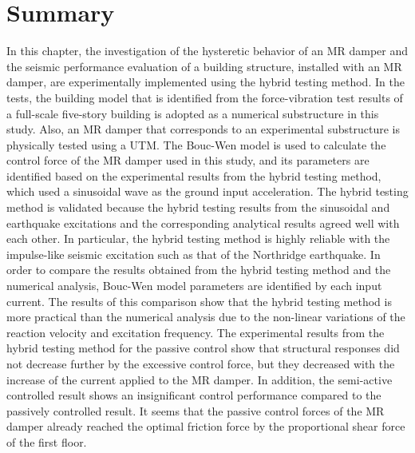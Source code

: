 \section{Summary}
In this chapter, the investigation of the hysteretic behavior of an MR damper and the seismic performance evaluation of a building structure, installed with an MR damper, are experimentally implemented using the hybrid testing method. In the tests, the building model that is identified from the force-vibration test results of a full-scale five-story building is adopted as a numerical substructure in this study. Also, an MR damper that corresponds to an experimental substructure is physically tested using a UTM. The Bouc-Wen model is used to calculate the control force of the MR damper used in this study, and its parameters are identified based on the experimental results from the hybrid testing method, which used a sinusoidal wave as the ground input acceleration. The hybrid testing method is validated because the hybrid testing results from the sinusoidal and earthquake excitations and the corresponding analytical results agreed well with each other. In particular, the hybrid testing method is highly reliable with the impulse-like seismic excitation such as that of the Northridge earthquake. In order to compare the results obtained from the hybrid testing method and the numerical analysis, Bouc-Wen model parameters are identified by each input current. The results of this comparison show that the hybrid testing method is more practical than the numerical analysis due to the non-linear variations of the reaction velocity and excitation frequency. The experimental results from the hybrid testing method for the passive control show that structural responses did not decrease further by the excessive control force, but they decreased with the increase of the current applied to the MR damper. In addition, the semi-active controlled result shows an insignificant control performance compared to the passively controlled result. It seems that the passive control forces of the MR damper already reached the optimal friction force by the proportional shear force of the first floor.